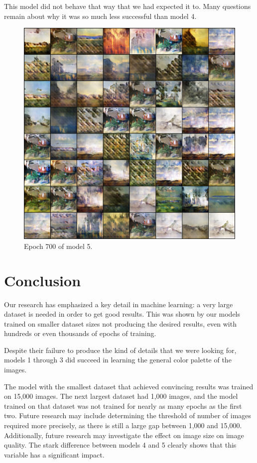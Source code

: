 \documentclass[11pt,letterpaper]{article}
\begin{document}
				This model did not behave that way that we had expected it to.
				Many questions remain about why it was so much less successful than model 4.
				\begin{figure}
					\centering
					\includegraphics[width=1.0\linewidth]{results/model5/epoch700_generator}
					\caption{Epoch 700 of model 5.}
					\label{fig:wa128:epoch700generator}
				\end{figure}

	\section{Conclusion}
		Our research has emphasized a key detail in machine learning: a very large dataset is needed in order to get good results.
		This was shown by our models trained on smaller dataset sizes not producing the desired results, even with hundreds or even thousands of epochs of training.

		Despite their failure to produce the kind of details that we were looking for, models 1 through 3 did succeed in learning the general color palette of the images.

		The model with the smallest dataset that achieved convincing results was trained on 15,000 images.
		The next largest dataset had 1,000 images, and the model trained on that dataset was not trained for nearly as many epochs as the first two.
		Future research may include determining the threshold of number of images required more precisely, as there is still a large gap between 1,000 and 15,000.
		Additionally, future research may investigate the effect on image size on image quality.
		The stark difference between models 4 and 5 clearly shows that this variable has a significant impact.
\end{document}
